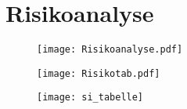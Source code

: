 \section{Risikoanalyse}
\begin{figure}[H]
	\centering
	\texttt{[image: Risikoanalyse.pdf]}
	\label{fig:Risikoanalyse}
\end{figure}

\begin{figure}[H]
	\centering
	\texttt{[image: Risikotab.pdf]}
	\label{fig:Risikodiagramm}
\end{figure}

\begin{figure}[H]
	\centering
	\texttt{[image: si\_tabelle]}
	\label{fig:Tabelle}
\end{figure}
